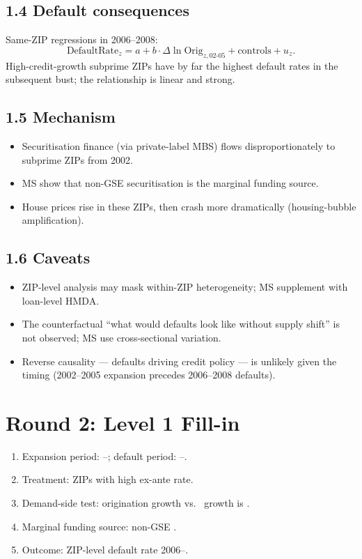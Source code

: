 \documentclass[11pt]{article}
\newcommand{\blank}[1]{\underline{\hspace{#1}}}
\begin{document}
\subsection*{1.4 Default consequences}
Same-ZIP regressions in 2006--2008:
\[
\text{DefaultRate}_{z}= a + b\cdot\Delta\ln\text{Orig}_{z,02\text{-}05}+\text{controls}+u_z.
\]
High-credit-growth subprime ZIPs have by far the highest default rates in the subsequent bust; the relationship is linear and strong.

\subsection*{1.5 Mechanism}
\begin{itemize}
\item Securitisation finance (via private-label MBS) flows disproportionately to subprime ZIPs from 2002.
\item MS show that non-GSE securitisation is the marginal funding source.
\item House prices rise in these ZIPs, then crash more dramatically (housing-bubble amplification).
\end{itemize}

\subsection*{1.6 Caveats}
\begin{alertbox}
\begin{itemize}
\item ZIP-level analysis may mask within-ZIP heterogeneity; MS supplement with loan-level HMDA.
\item The counterfactual ``what would defaults look like without supply shift'' is not observed; MS use cross-sectional variation.
\item Reverse causality --- defaults driving credit policy --- is unlikely given the timing (2002--2005 expansion precedes 2006--2008 defaults).
\end{itemize}
\end{alertbox}

\section*{Round 2: Level 1 Fill-in}
\begin{enumerate}
\item Expansion period: \blank{1cm}--\blank{1cm}; default period: \blank{1cm}--\blank{1cm}.
\item Treatment: ZIPs with high ex-ante \blank{1.5cm} rate.
\item Demand-side test: origination growth vs.\ \blank{1.5cm} growth is \blank{1cm}.
\item Marginal funding source: non-GSE \blank{1.5cm}.
\item Outcome: ZIP-level default rate 2006--\blank{1cm}.
\end{enumerate}
\end{document}
